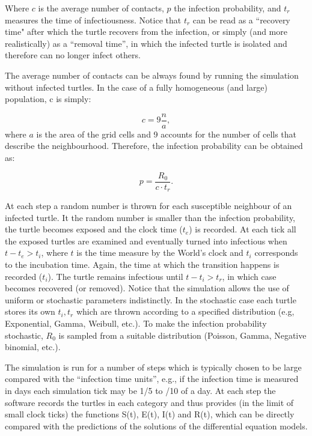 \documentclass[a4paper,oneside,11pt]{article}
\begin{document}
Where $c$ is the average number of contacts, $p$ the infection probability, and $t_r$ measures the time of infectiousness. Notice that $t_r$ can be read as a ``recovery time" after which the turtle recovers from the infection, or simply (and more realistically) as a ``removal time'', in which the infected turtle is isolated and therefore can no longer infect others. 

The average number of contacts can be always found by running the simulation without infected turtles. In the case of a fully homogeneous (and large) population, c is simply:

\begin{equation}
c = 9 \frac{n}{a},
\end{equation}
%
where $a$ is the area of the grid cells and 9 accounts for the number of cells that describe the neighbourhood. Therefore, the infection probability can be obtained as: 

\begin{equation}
p = \frac{R_0}{c \cdot t_r}.
\end{equation}

At each step a random number is thrown for each susceptible neighbour of an infected turtle. It the random number is smaller than the infection probability, the turtle becomes exposed and the clock time ($t_e$) is recorded. At each tick all the exposed turtles are examined and eventually turned into infectious when 
$t - t_e > t_i$, where $t$ is the time measure by the World's clock and $t_i$ corresponds to the incubation time. Again, the time at which the transition happens is recorded ($t_i$). The turtle remains infectious until $t - t_i > t_r$, in which case becomes recovered (or removed). 
Notice that the simulation allows the use of uniform or stochastic parameters indistinctly. In the stochastic case each turtle stores its own $t_i, t_r$ which are thrown according to a specified distribution (e.g, Exponential, Gamma, Weibull, etc.). To make the infection probability stochastic, $R_0$ is sampled from a suitable distribution (Poisson, Gamma, Negative binomial, etc.). 

The simulation is run for a number of steps which is typically chosen to be large compared with the ``infection time units'', e.g., if the infection time is measured in days each simulation tick may be 1/5 to /10 of a day. At each step the software records the turtles in each category and thus provides (in the limit of small clock ticks) the functions S(t), E(t), I(t) and R(t), which can be directly compared with the predictions of the solutions of the differential equation models.
\end{document}
